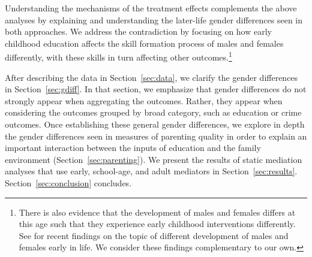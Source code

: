 Understanding the mechanisms of the treatment effects complements the above analyses by explaining and understanding the later-life gender differences seen in both approaches. We address the contradiction by focusing on how early childhood education affects the skill formation process of males and females differently, with these skills in turn affecting other outcomes.\footnote{There is also evidence that the development of males and females differs at this age such that they experience early childhood interventions differently. See \citet{Beeghly-etal_2017_IMHJ,Dayton_2017_IMHJ,Iruka_2017_IMHJ,Schore_2017_IMHJ} for recent findings on the topic of different development of males and females early in life. We consider these findings complementary to our own.}

After describing the data in Section~\ref{sec:data}, we clarify the gender differences in Section~\ref{sec:gdiff}. In that section, we emphasize that gender differences do not strongly appear when aggregating the outcomes. Rather, they appear when considering the outcomes grouped by broad category, such as education or crime outcomes. 
Once establishing these general gender differences, we explore in depth the gender differences seen in measures of parenting quality in order to explain an important interaction between the inputs of education and the family environment (Section~\ref{sec:parenting}).
We present the results of static mediation analyses that use early, school-age, and adult mediators in Section~\ref{sec:results}. Section~\ref{sec:conclusion} concludes.
